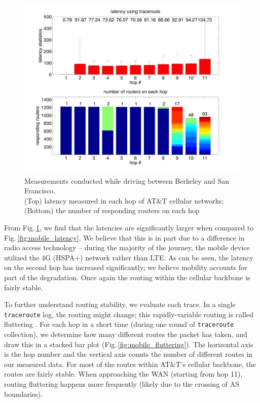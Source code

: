\begin{figure}
  \centering
  \includegraphics[width=\linewidth]{../figs/mobile_sfo.pdf}
  \vspace{-1em}
  \caption{Measurements conducted while driving between Berkeley and San Francisco.\\ (Top) latency measured in each hop of AT\&T cellular networks; (Bottom) the number of responding routers on each hop}
  \label{fig:mobile_mobile}
\end{figure}

From Fig.\,\ref{fig:mobile_mobile}, we find that the latencies are significantly larger when compared to Fig.\,\ref{fig:mobile_latency}. We believe that this is in part due to a difference in radio access technology -- during the majority of the journey, the mobile device utilized the 4G (HSPA+) network rather than LTE. As can be seen, the latency on the second hop has increased significantly; we believe mobility accounts for part of the degradation. Once again the routing within the cellular backbone is fairly stable.

To further understand routing stability, we evaluate each trace. In a single \texttt{traceroute} log, the routing might change; this rapidly-variable routing is called fluttering \cite{paxson1997measurements}. For each hop in a short time (during one round of \texttt{traceroute} collection), we determine how many different routes the packet has taken, and draw this in a stacked bar plot (Fig.\,\ref{fig:mobile_fluttering}). The horizontal axis is the hop number and the vertical axis counts the number of different routes in our measured data. For most of the routes within AT\&T's cellular backbone, the routes are fairly stable. When approaching the WAN (starting from hop 11), routing fluttering happens more frequently (likely due to the crossing of AS boundaries).

